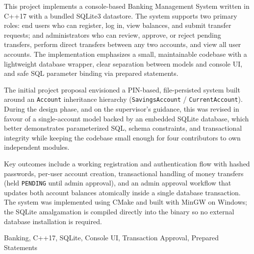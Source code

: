 \noindent
This project implements a console-based Banking Management System written in C++17 with a bundled SQLite3 datastore. The system supports two primary roles: end users who can register, log in, view balances, and submit transfer requests; and administrators who can review, approve, or reject pending transfers, perform direct transfers between any two accounts, and view all user accounts. The implementation emphasizes a small, maintainable codebase with a lightweight database wrapper, clear separation between models and console UI, and safe SQL parameter binding via prepared statements.

The initial project proposal envisioned a PIN-based, file-persisted system built around an \texttt{Account} inheritance hierarchy (\texttt{SavingsAccount} / \texttt{CurrentAccount}). During the design phase, and on the supervisor's guidance, this was revised in favour of a single-account model backed by an embedded SQLite database, which better demonstrates parameterized SQL, schema constraints, and transactional integrity while keeping the codebase small enough for four contributors to own independent modules.

Key outcomes include a working registration and authentication flow with hashed passwords, per-user account creation, transactional handling of money transfers (held \texttt{PENDING} until admin approval), and an admin approval workflow that updates both account balances atomically inside a single database transaction. The system was implemented using CMake and built with MinGW on Windows; the SQLite amalgamation is compiled directly into the binary so no external database installation is required.

\begin{keywords}
Banking, C++17, SQLite, Console UI, Transaction Approval, Prepared Statements
\end{keywords}